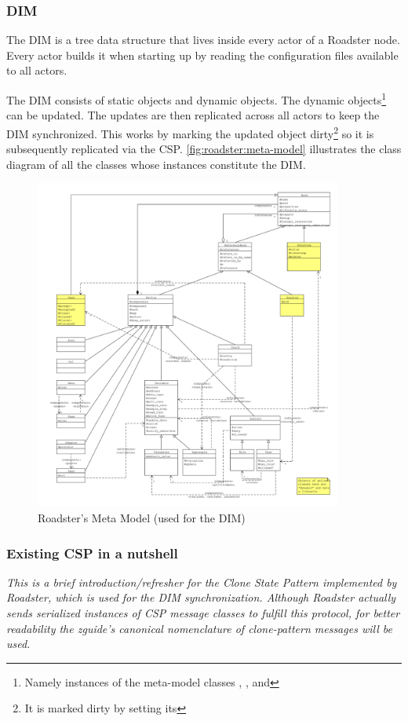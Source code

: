 \subsubsection{DIM}
The \acrfull{DIM} is a tree data structure that lives inside every actor of a Roadster
node. Every actor builds it when starting up by reading the configuration
files available to all actors.

The DIM consists of static objects and dynamic objects. The dynamic
objects\footnote{Namely instances of the meta-model classes ,
, and } can be updated. The updates are then
replicated across all actors to keep the DIM synchronized. This works by
marking the updated object dirty\footnote{It is marked dirty by setting its
} so it is subsequently replicated via the
\gls{CSP}. \autoref{fig:roadster:meta-model} illustrates the class diagram of
all the classes whose instances constitute the DIM.

\begin{figure}[]
	\includegraphics[trim=1.5cm 1cm 1cm 1cm, clip=true, width=0.9\textwidth]{img/meta_model.pdf}
	\caption{Roadster's Meta Model (used for the DIM)}
	\label{fig:roadster:meta-model}
\end{figure}

\subsubsection{Existing CSP in a nutshell}
\emph{This is a brief introduction/refresher for the Clone State Pattern
implemented by Roadster, which is used for the DIM synchronization. Although Roadster actually sends serialized instances
of CSP message classes to fulfill this protocol, for better readability the
\gls{zguide}'s canonical nomenclature of \gls{clone-pattern} messages will be used.}

